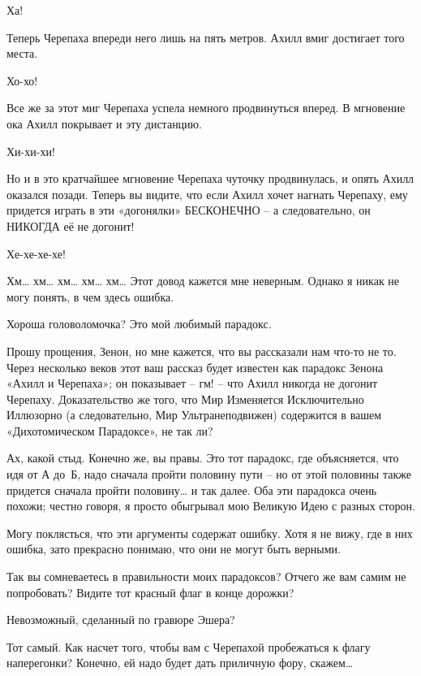 \documentclass[../main.tex]{subfiles}
\begin{document}
\begin{dialogue}
 Ха!

 Теперь Черепаха впереди него лишь на пять метров. Ахилл вмиг достигает того места.

 Хо-хо!

 Все же за этот миг Черепаха успела немного продвинуться вперед. В мгновение ока Ахилл покрывает и эту дистанцию.

 Хи-хи-хи!

 Но и в это кратчайшее мгновение Черепаха чуточку продвинулась, и опять Ахилл оказался позади. Теперь вы видите, что если Ахилл хочет нагнать Черепаху, ему придется играть в эти «догонялки» БЕСКОНЕЧНО \--- а следовательно, он НИКОГДА её не догонит!

 Хе-хе-хе-хе!

 Хм\ldots{} хм\ldots{} хм\ldots{} хм\ldots{} хм\ldots{} Этот довод кажется мне неверным. Однако я никак не могу понять, в чем здесь ошибка.

 Хороша головоломочка? Это мой любимый парадокс.

 Прошу прощения, Зенон, но мне кажется, что вы рассказали нам что-то не то. Через несколько веков этот ваш рассказ будет известен как парадокс Зенона «Ахилл и Черепаха»; он показывает \--- гм! \--- что Ахилл никогда не догонит Черепаху. Доказательство же того, что Мир Изменяется Исключительно Иллюзорно (а следовательно, Мир Ультранеподвижен) содержится в вашем «Дихотомическом Парадоксе», не так ли?

 Ах, какой стыд. Конечно же, вы правы. Это тот парадокс, где объясняется, что идя от А до~Б, надо сначала пройти половину пути \--- но от этой половины также придется сначала пройти половину\ldots{} и так далее. Оба эти парадокса очень похожи; честно говоря, я просто обыгрывал мою Великую Идею с разных сторон.

 Могу поклясться, что эти аргументы содержат ошибку. Хотя я не вижу, где в них ошибка, зато прекрасно понимаю, что они не могут быть верными.

 Так вы сомневаетесь в правильности моих парадоксов? Отчего же вам самим не попробовать? Видите тот красный флаг в конце дорожки?

 Невозможный, сделанный по гравюре Эшера?

 Тот самый. Как насчет того, чтобы вам с Черепахой пробежаться к флагу наперегонки? Конечно, ей надо будет дать приличную фору, скажем\ldots{}


\end{dialogue}
\end{document}
